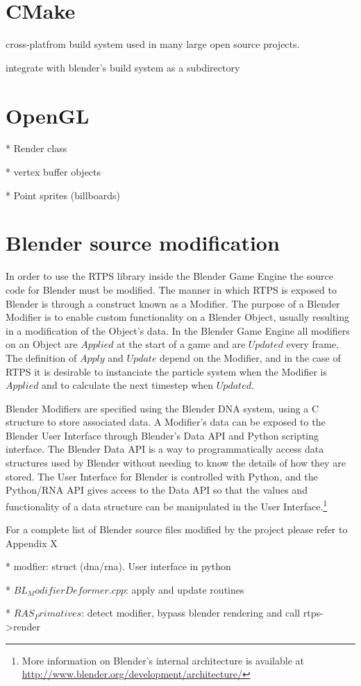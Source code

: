 \section{CMake}
cross-platfrom build system used in many large open source projects.


integrate with blender's build system as a subdirectory


\section{OpenGL}
* Render class


* vertex buffer objects


* Point sprites (billboards)




\section{Blender source modification}

In order to use the RTPS library inside the Blender Game Engine the source code
for Blender must be modified. The manner in which RTPS is exposed to Blender is
through a construct known as a Modifier. The purpose of a Blender Modifier is
to enable custom functionality on a Blender Object, usually resulting in a
modification of the Object's data. In the Blender Game Engine all modifiers on an Object are
$Applied$ at the start of a game and are $Updated$ every frame. The definition
of $Apply$ and $Update$ depend on the Modifier, and in the case of RTPS it is
desirable to instanciate the particle system when the Modifier is $Applied$ and
to calculate the next timestep when $Updated$.


Blender Modifiers are specified using the Blender DNA system, using a C
structure to store associated data. A Modifier's data can be exposed to the Blender User Interface
through Blender's Data API and Python scripting interface. The Blender Data API
is a way to programmatically access data structures used by Blender without
needing to know the details of how they are stored.\cite{b3dDataAPI} The User
Interface for Blender is controlled with Python, and the Python/RNA API gives
access to the Data API so that the values and functionality of a data structure
can be manipulated in the User Interface.\footnote{More information on
Blender's internal architecture is available at
\url{http://www.blender.org/development/architecture/}}



For a complete list of Blender source files modified by the project please refer to Appendix X

* modfier: struct (dna/rna). User interface in python


* $BL_ModifierDeformer.cpp$: apply and update routines


* $RAS_Primatives$: detect modifier, bypass blender rendering and call rtps->render



